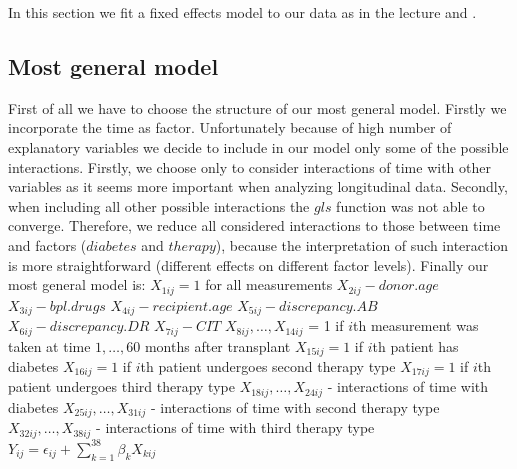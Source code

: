 \documentclass[num-refs]{wiley-article}
\begin{document}
In this section we fit a fixed effects model to our data as in the lecture and \cite[Chapters 5-7]{ALA}.

\subsection{Most general model}

First of all we have to choose the structure of our most general model. Firstly we incorporate the time as factor. Unfortunately because of high number of explanatory variables we decide to include in our model only some of the possible interactions. Firstly, we choose only to consider interactions of time with other variables as it seems more important when analyzing longitudinal data. Secondly, when including all other possible interactions the $gls$ function was not able to converge. Therefore, we reduce all considered interactions to those between time and factors ($diabetes$ and $therapy$), because the interpretation of such interaction is more straightforward (different effects on different factor levels). Finally our most general model is: \newline
$X_{1ij} = 1$ for all measurements \newline
$X_{2ij} - donor.age$ \newline
$X_{3ij} - bpl.drugs$ \newline
$X_{4ij} - recipient.age $\newline
$X_{5ij} - discrepancy.AB$ \newline
$X_{6ij} - discrepancy.DR $\newline
$X_{7ij} - CIT$ \newline
$X_{8ij}, \ldots, X_{14ij}$ = 1 if $i$th measurement was taken at time $1, \ldots, 60$ months after transplant  \newline
$X_{15ij} = 1$ if $i$th patient has diabetes \newline
$X_{16ij} = 1$ if $i$th patient undergoes second therapy type \newline
$X_{17ij} = 1$ if $i$th patient undergoes third therapy type \newline
$X_{18ij}, \ldots, X_{24ij}$ - interactions of time with diabetes \newline
$X_{25ij}, \ldots, X_{31ij}$ - interactions of time with second therapy type \newline
$X_{32ij}, \ldots, X_{38ij}$ - interactions of time with third therapy type \newline \newline
$Y_{ij} = \epsilon_{ij} + \sum_{k=1}^{38} \beta_k X_{kij}$ \newline
\end{document}
